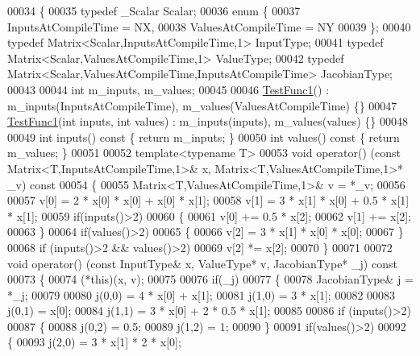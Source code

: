 \begin{DoxyCode}
00034 \{
00035   \textcolor{keyword}{typedef} \_Scalar Scalar;
00036   \textcolor{keyword}{enum} \{
00037     InputsAtCompileTime = NX,
00038     ValuesAtCompileTime = NY
00039   \};
00040   \textcolor{keyword}{typedef} Matrix<Scalar,InputsAtCompileTime,1> InputType;
00041   \textcolor{keyword}{typedef} Matrix<Scalar,ValuesAtCompileTime,1> ValueType;
00042   \textcolor{keyword}{typedef} Matrix<Scalar,ValuesAtCompileTime,InputsAtCompileTime> JacobianType;
00043 
00044   \textcolor{keywordtype}{int} m\_inputs, m\_values;
00045 
00046   \hyperlink{struct_test_func1}{TestFunc1}() : m\_inputs(InputsAtCompileTime), m\_values(ValuesAtCompileTime) \{\}
00047   \hyperlink{struct_test_func1}{TestFunc1}(\textcolor{keywordtype}{int} inputs, \textcolor{keywordtype}{int} values) : m\_inputs(inputs), m\_values(values) \{\}
00048 
00049   \textcolor{keywordtype}{int} inputs()\textcolor{keyword}{ const }\{ \textcolor{keywordflow}{return} m\_inputs; \}
00050   \textcolor{keywordtype}{int} values()\textcolor{keyword}{ const }\{ \textcolor{keywordflow}{return} m\_values; \}
00051 
00052   \textcolor{keyword}{template}<\textcolor{keyword}{typename} T>
00053   \textcolor{keywordtype}{void} operator() (\textcolor{keyword}{const} Matrix<T,InputsAtCompileTime,1>& x, Matrix<T,ValuesAtCompileTime,1>* \_v)\textcolor{keyword}{ const}
00054 \textcolor{keyword}{  }\{
00055     Matrix<T,ValuesAtCompileTime,1>& v = *\_v;
00056 
00057     v[0] = 2 * x[0] * x[0] + x[0] * x[1];
00058     v[1] = 3 * x[1] * x[0] + 0.5 * x[1] * x[1];
00059     \textcolor{keywordflow}{if}(inputs()>2)
00060     \{
00061       v[0] += 0.5 * x[2];
00062       v[1] += x[2];
00063     \}
00064     \textcolor{keywordflow}{if}(values()>2)
00065     \{
00066       v[2] = 3 * x[1] * x[0] * x[0];
00067     \}
00068     \textcolor{keywordflow}{if} (inputs()>2 && values()>2)
00069       v[2] *= x[2];
00070   \}
00071 
00072   \textcolor{keywordtype}{void} operator() (\textcolor{keyword}{const} InputType& x, ValueType* v, JacobianType* \_j)\textcolor{keyword}{ const}
00073 \textcolor{keyword}{  }\{
00074     (*this)(x, v);
00075 
00076     \textcolor{keywordflow}{if}(\_j)
00077     \{
00078       JacobianType& j = *\_j;
00079 
00080       j(0,0) = 4 * x[0] + x[1];
00081       j(1,0) = 3 * x[1];
00082 
00083       j(0,1) = x[0];
00084       j(1,1) = 3 * x[0] + 2 * 0.5 * x[1];
00085 
00086       \textcolor{keywordflow}{if} (inputs()>2)
00087       \{
00088         j(0,2) = 0.5;
00089         j(1,2) = 1;
00090       \}
00091       \textcolor{keywordflow}{if}(values()>2)
00092       \{
00093         j(2,0) = 3 * x[1] * 2 * x[0];

\end{DoxyCode}
